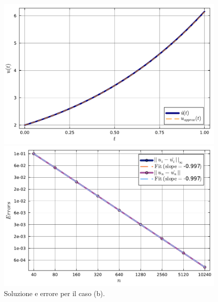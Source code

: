 \documentclass[letterpaper, 12pt]{article}
\numberwithin{equation}{section}    %
\begin{document}
\begin{figure}[!ht]
    \centering
    \begin{minipage}[b]{0.47\textwidth}
        \includegraphics[width=\textwidth]{6223.pdf}
    \end{minipage}
    \hspace{0.5cm}
    \begin{minipage}[b]{0.47\textwidth}
        \includegraphics[width=\textwidth]{6224.pdf}
    \end{minipage}
    \caption{Soluzione e errore per il caso (b).}
    \label{fig:es6_2_1_2}
\end{figure}
\end{document}
